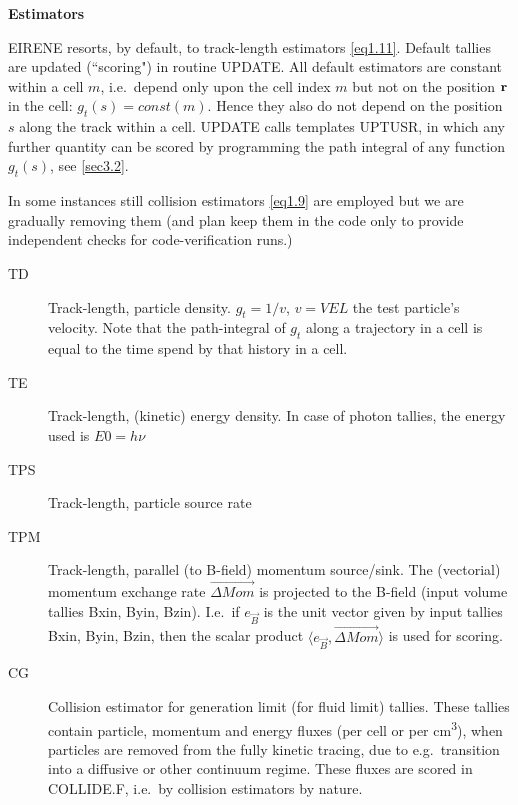 \begin{landscape}
  \bigskip

  \textbf{Estimators}

  EIRENE resorts, by default, to track-length estimators \cref{eq1.11}.
  Default tallies are updated (``scoring") in routine UPDATE.
  All default estimators are constant within a cell $m$, i.e.\ depend only upon
  the cell index $m$ but not on the position $\mathbf{r}$ in the cell: $g_t(s) =
    const(m)$.
  Hence they also do not depend on the position $s$ along the track within a
  cell.
  UPDATE calls templates UPTUSR, in which any further quantity can be scored by
  programming the path integral of any function $g_t(s)$, see \cref{sec3.2}.

  In some instances still collision estimators \cref{eq1.9} are employed but we
  are gradually removing them (and plan keep them in the code only to provide
  independent checks for code-verification runs.)
  \begin{description}
    \item[TD] Track-length, particle density.
          $g_t= 1/v$, $v=VEL$ the test particle's velocity.
          Note that the path-integral of $g_t$ along a trajectory in a cell is equal to
          the time spend by that history in a cell.
    \item[TE] Track-length, (kinetic) energy density.
          In case of photon tallies, the energy used is $E0 = h\nu$
    \item[TPS] Track-length, particle source rate
    \item[TPM] Track-length, parallel (to
          B-field) momentum source/sink.
          The (vectorial) momentum exchange rate $\vec{\Delta Mom}$ is projected to the
          B-field (input volume tallies Bxin, Byin, Bzin).
          I.e.\ if $e_{\vec B}$ is the unit vector given by input tallies Bxin, Byin,
          Bzin, then the scalar product $\langle e_{\vec B}, \vec{\Delta Mom}\rangle$ is
          used for scoring.
    \item[CG] Collision estimator for generation limit (for fluid limit) tallies.
          These tallies contain particle, momentum and energy fluxes (per cell or per
          \si{\cubic\centi\metre}), when particles are removed from the fully kinetic
          tracing, due to e.g.\ transition into a diffusive or other continuum regime.
          These fluxes are scored in COLLIDE.F, i.e.\ by collision estimators by nature.
  \end{description}

  \newpage


\end{landscape}
